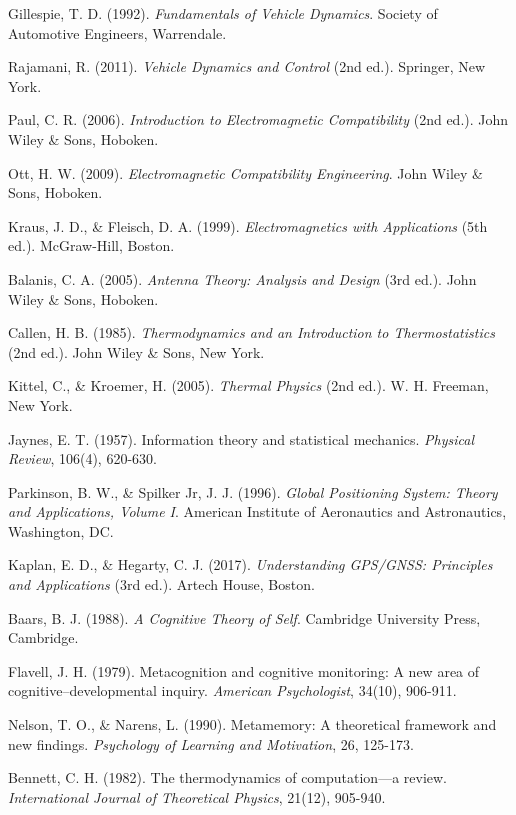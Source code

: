 \documentclass[12pt,a4paper]{article}
\begin{document}
\begin{thebibliography}{99}
 Gillespie, T. D. (1992). \textit{Fundamentals of Vehicle Dynamics}. Society of Automotive Engineers, Warrendale.

 Rajamani, R. (2011). \textit{Vehicle Dynamics and Control} (2nd ed.). Springer, New York.

 Paul, C. R. (2006). \textit{Introduction to Electromagnetic Compatibility} (2nd ed.). John Wiley \& Sons, Hoboken.

 Ott, H. W. (2009). \textit{Electromagnetic Compatibility Engineering}. John Wiley \& Sons, Hoboken.

 Kraus, J. D., \& Fleisch, D. A. (1999). \textit{Electromagnetics with Applications} (5th ed.). McGraw-Hill, Boston.

 Balanis, C. A. (2005). \textit{Antenna Theory: Analysis and Design} (3rd ed.). John Wiley \& Sons, Hoboken.

 Callen, H. B. (1985). \textit{Thermodynamics and an Introduction to Thermostatistics} (2nd ed.). John Wiley \& Sons, New York.

 Kittel, C., \& Kroemer, H. (2005). \textit{Thermal Physics} (2nd ed.). W. H. Freeman, New York.

 Jaynes, E. T. (1957). Information theory and statistical mechanics. \textit{Physical Review}, 106(4), 620-630.

 Parkinson, B. W., \& Spilker Jr, J. J. (1996). \textit{Global Positioning System: Theory and Applications, Volume I}. American Institute of Aeronautics and Astronautics, Washington, DC.

 Kaplan, E. D., \& Hegarty, C. J. (2017). \textit{Understanding GPS/GNSS: Principles and Applications} (3rd ed.). Artech House, Boston.

 Baars, B. J. (1988). \textit{A Cognitive Theory of Self}. Cambridge University Press, Cambridge.

 Flavell, J. H. (1979). Metacognition and cognitive monitoring: A new area of cognitive–developmental inquiry. \textit{American Psychologist}, 34(10), 906-911.

 Nelson, T. O., \& Narens, L. (1990). Metamemory: A theoretical framework and new findings. \textit{Psychology of Learning and Motivation}, 26, 125-173.

 Bennett, C. H. (1982). The thermodynamics of computation—a review. \textit{International Journal of Theoretical Physics}, 21(12), 905-940.


\end{thebibliography}
\end{document}
